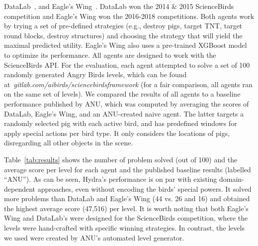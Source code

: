 \documentclass[letterpaper]{article} %
\begin{document}
DataLab~\cite{borovicka2014datalab}, and
Eagle's Wing~\cite{wang2017description}.
DataLab won the 2014 \& 2015 ScienceBirds competition and Eagle's Wing won the 2016-2018 competitions.
Both agents work by trying a set of pre-defined strategies (e.g., destroy pigs, target TNT, target round blocks, destroy structures) and choosing the strategy that will yield the maximal predicted utility.
Eagle's Wing also uses a pre-trained XGBoost model to optimize its performance. %
All agents are designed to work with the ScienceBirds API. For the evaluation, each agent attempted to solve a set of 100 randomly generated Angry Birds levels, which can be found at~\emph{gitlab.com/aibirds/sciencebirdsframework} (for a fair comparison, all agents ran on the same set of levels).
We compared the results of all agents to a baseline performance published by ANU, which was computed by averaging the scores of
DataLab,
Eagle's Wing,
and an ANU-created naive agent.
The latter targets a randomly selected pig with each active bird, and has predefined windows for apply special actions per bird type. It only considers the locations of pigs, disregarding all other objects in the scene.




Table~\ref{tab:results} shows the number of problem solved (out of 100) and the average score per level for each agent and the published baseline results (labelled ``ANU'').
As can be seen, Hydra's performance is on par with existing domain-dependent approaches, even without encoding the birds' special powers. It solved more problems than DataLab and Eagle's Wing (44 vs. 26 and 16) and obtained the highest average score (47,516) per level.
It is worth noting that both Eagle's Wing and DataLab's were designed for the ScienceBirds competition, where the levels were hand-crafted with specific winning strategies. In contrast, the levels we used were created by ANU's automated level generator.
\end{document}
